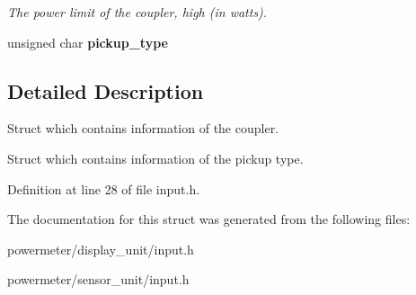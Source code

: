 \begin{CompactItemize}
\begin{CompactList}\small\item\em The power limit of the coupler, high (in watts). \item\end{CompactList}\item 
\hypertarget{structstruct__coupler__settings_2fd8505e4fb058a3fe3e1417a6723229}{
unsigned char \textbf{pickup\_\-type}}
\label{structstruct__coupler__settings_2fd8505e4fb058a3fe3e1417a6723229}

\end{CompactItemize}


\subsection{Detailed Description}
Struct which contains information of the coupler. 

Struct which contains information of the pickup type. 

Definition at line 28 of file input.h.

The documentation for this struct was generated from the following files:\begin{CompactItemize}
\item 
powermeter/display\_\-unit/input.h\item 
powermeter/sensor\_\-unit/input.h\end{CompactItemize}

